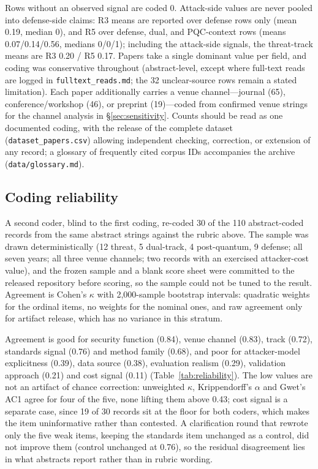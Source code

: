 \documentclass[10.5pt,compsoc,winfonts]{ICN}
\begin{document}
Rows without an observed signal are coded 0. Attack-side values are never pooled into defense-side claims: R3 means are reported over defense rows only (mean 0.19, median 0), and R5 over defense, dual, and PQC-context rows (means 0.07/0.14/0.56, medians 0/0/1); including the attack-side signals, the threat-track means are R3 0.20 / R5 0.17. Papers take a single dominant value per field, and coding was conservative throughout (abstract-level, except where full-text reads are logged in \texttt{fulltext\_reads.md}; the 32 unclear-source rows remain a stated limitation). Each paper additionally carries a venue channel—journal (65), conference/workshop (46), or preprint (19)—coded from confirmed venue strings for the channel analysis in \S\ref{sec:sensitivity}. Counts should be read as one documented coding, with the release of the complete dataset (\texttt{dataset\_papers.csv}) allowing independent checking, correction, or extension of any record; a glossary of frequently cited corpus IDs accompanies the archive (\texttt{data/glossary.md}).

\subsection{Coding reliability}
\label{sec:reliability}
A second coder, blind to the first coding, re-coded 30 of the 110 abstract-coded records from the
same abstract strings against the rubric above. The sample was drawn deterministically (12 threat,
5 dual-track, 4 post-quantum, 9 defense; all seven years; all three venue channels; two records
with an exercised attacker-cost value), and the frozen sample and a blank score sheet were
committed to the released repository before scoring, so the sample could not be tuned to the
result. Agreement is Cohen's $\kappa$ with 2,000-sample bootstrap intervals: quadratic weights for
the ordinal items, no weights for the nominal ones, and raw agreement only for artifact release,
which has no variance in this stratum.

Agreement is good for security function (0.84), venue channel (0.83), track (0.72), standards
signal (0.76) and method family (0.68), and poor for attacker-model explicitness (0.39), data
source (0.38), evaluation realism (0.29), validation approach (0.21) and cost signal (0.11)
(Table~\ref{tab:reliability}). The low values are not an artifact of chance correction:
unweighted $\kappa$, Krippendorff's $\alpha$ and Gwet's AC1 agree for four of the five, none
lifting them above 0.43; cost signal is a separate case, since 19 of 30 records sit at the floor
for both coders, which makes the item uninformative rather than contested. A clarification round
that rewrote only the five weak items, keeping the standards item unchanged as a control, did not
improve them (control unchanged at 0.76), so the residual disagreement lies in what abstracts
report rather than in rubric wording.
\end{document}
